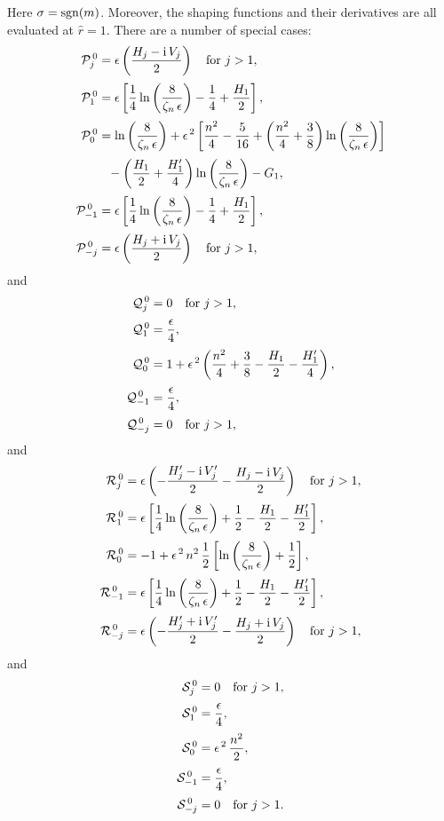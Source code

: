 \documentclass[12pt,prb,aps]{revtex4-1}
\begin{document}
Here $\sigma={\rm sgn}(m)$. Moreover, the shaping functions and their derivatives are all evaluated at $\hat{r}=1$. 
There are a number of special cases: 
\begin{align}
{\cal P}_j^{\,0} &= \epsilon\left(\frac{H_j-{\rm i}\,V_j}{2}\right)\mbox{~~~for $j>1$},\\[0.5ex]
{\cal P}_1^{\,0} &=\epsilon\left[\frac{1}{4}\ln\left(\frac{8}{\zeta_n\,\epsilon}\right)-\frac{1}{4}+\frac{H_1}{2}\right],\\[0.5ex]
{\cal P}_0^{\,0}  &= \ln\left(\frac{8}{\zeta_n\,\epsilon}\right)+\epsilon^{\,2}\left[\frac{n^2}{4} -\frac{5}{16} + \left(\frac{n^2}{4}+\frac{3}{8}\right)\ln\left(\frac{8}{\zeta_n\,\epsilon}\right)\right]\nonumber\\[0.5ex]
&\phantom{=}-\left(\frac{H_1}{2}+\frac{H_1'}{4}\right)\ln\left(\frac{8}{\zeta_n\,\epsilon}\right)-G_1,\\[0.5ex]
{\cal P}_{-1}^{\,0} &=\epsilon\left[\frac{1}{4}\ln\left(\frac{8}{\zeta_n\,\epsilon}\right)-\frac{1}{4}+\frac{H_1}{2}\right],\\[0.5ex]
{\cal P}_{-j}^{\,0}   &= \epsilon\left(\frac{H_j+{\rm i}\,V_j}{2}\right)\mbox{~~~for $j>1$},
\end{align}
and
\begin{align}
{\cal Q}_j^{\,0} &= 0\mbox{~~~for $j>1$},\\[0.5ex]
{\cal Q}_1^{\,0} &=\frac{\epsilon}{4},\\[0.5ex]
{\cal Q}_0^{\,0}  &= 1+ \epsilon^{\,2}\left(\frac{n^2}{4} + \frac{3}{8} - \frac{H_1}{2} - \frac{H_1'}{4}\right),\\[0.5ex]
{\cal Q}_{-1}^{\,0} &=\frac{\epsilon}{4},\\[0.5ex]
{\cal Q}_{-j}^{\,0}   &= 0\mbox{~~~for $j>1$},
\end{align}
and 
\begin{align}
{\cal R}_j^{\,0}&= \epsilon\left(-\frac{H_j'-{\rm i}\,V_j'}{2}-\frac{H_j-{\rm i}\,V_j}{2}\right)\mbox{~~~for $j>1$},\\[0.5ex]
{\cal R}_1^{\,0} &=\epsilon\left[\frac{1}{4}\ln\left(\frac{8}{\zeta_n\,\epsilon}\right)+\frac{1}{2}-\frac{H_1}{2}-\frac{H_1'}{2}\right],\\[0.5ex]
{\cal R}_0^{\,0}  &= -1+\epsilon^{\,2}\,n^2\,\frac{1}{2}\left[\ln\left(\frac{8}{\zeta_n\,\epsilon}\right)+\frac{1}{2}\right],\\[0.5ex]
{\cal R}_{-1}^{\,0} &=\epsilon\left[\frac{1}{4}\ln\left(\frac{8}{\zeta_n\,\epsilon}\right)+\frac{1}{2}-\frac{H_1}{2}-\frac{H_1'}{2}\right],\\[0.5ex]
{\cal R}_{-j}^{\,0}   &= \epsilon\left(-\frac{H_j'+{\rm i}\,V_j'}{2}-\frac{H_j+{\rm i}\,V_j}{2}\right)\mbox{~~~for $j>1$},
\end{align}
and
\begin{align}
{\cal S}_j^{\,0} &= 0\mbox{~~~for $j>1$},\\[0.5ex]
{\cal S}_1^{\,0} &=\frac{\epsilon}{4},\\[0.5ex]
{\cal S}_0^{\,0} &= \epsilon^{\,2}\,\frac{n^2}{2},\\[0.5ex]
{\cal S}_{-1}^{\,0} &=\frac{\epsilon}{4},\\[0.5ex]
{\cal S}_{-j}^{\,0}   &= 0\mbox{~~~for $j>1$}.
\end{align}
\end{document}
